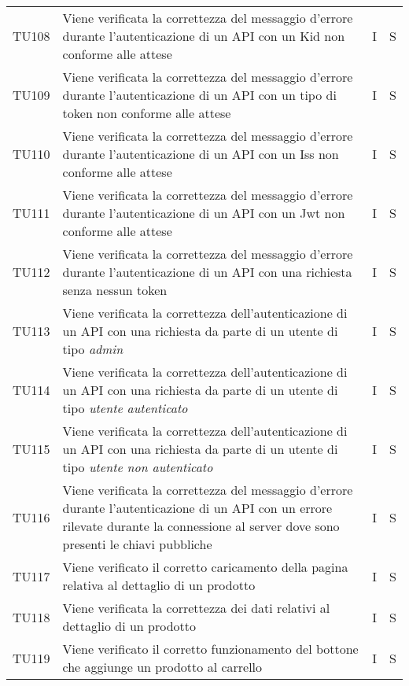 {\begin{longtable}{C{2cm} C{9.6cm} C{1.5cm} C{1cm}}
TU108 & Viene verificata la correttezza del messaggio d'errore durante l'autenticazione di un API con un Kid non conforme alle attese & I & S\\

TU109 & Viene verificata la correttezza del messaggio d'errore durante l'autenticazione di un API con un tipo di token non conforme alle attese & I & S\\

TU110 & Viene verificata la correttezza del messaggio d'errore durante l'autenticazione di un API con un Iss non conforme alle attese & I & S\\

TU111 & Viene verificata la correttezza del messaggio d'errore durante l'autenticazione di un API con un Jwt non conforme alle attese & I & S\\

TU112 & Viene verificata la correttezza del messaggio d'errore durante l'autenticazione di un API con una richiesta senza nessun token & I & S\\

TU113 & Viene verificata la correttezza dell'autenticazione di un API con una richiesta da parte di un utente di tipo \textit{admin} & I & S\\

TU114 & Viene verificata la correttezza dell'autenticazione di un API con una richiesta da parte di un utente di tipo \textit{utente autenticato} & I & S\\

TU115 & Viene verificata la correttezza dell'autenticazione di un API con una richiesta da parte di un utente di tipo \textit{utente non autenticato} & I & S\\

TU116 & Viene verificata la correttezza del messaggio d'errore durante l'autenticazione di un API con un errore rilevate durante la connessione al server dove sono presenti le chiavi pubbliche & I & S\\

TU117 & Viene verificato il corretto caricamento della pagina relativa al dettaglio di un prodotto & I & S\\

TU118 & Viene verificata la correttezza dei dati relativi al dettaglio di un prodotto & I & S\\

TU119 & Viene verificato il corretto funzionamento del bottone che aggiunge un prodotto al carrello & I & S\\


\end{longtable}}
